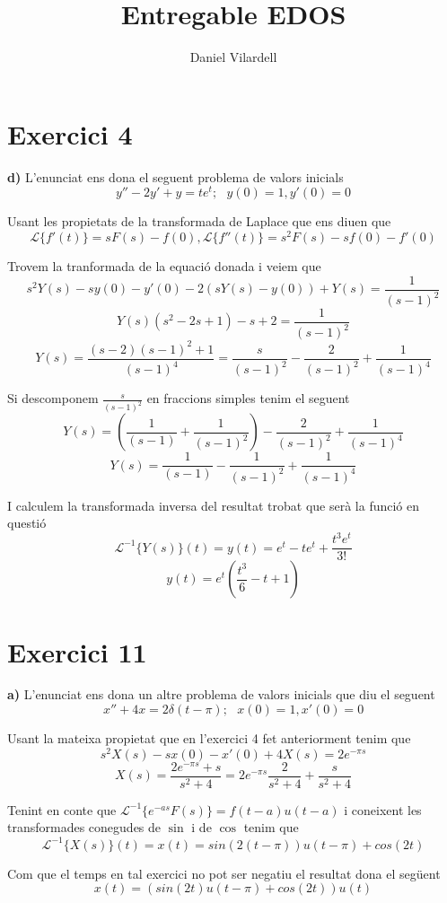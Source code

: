 \documentclass[12pt, a4papre]{article}
\author{Daniel Vilardell}
\title{Entregable EDOS}
\date{}
\begin{document}
	\maketitle
	\section{Exercici 4}
	\textbf{d)} L'enunciat ens dona el seguent problema de valors inicials
	\[
		y''-2y'+y=te^t; \textrm{  }y(0)=1,y'(0)=0
	\]
	
	Usant les propietats de la transformada de Laplace que ens diuen que 
	\[
		\mathcal{L}\{f'(t)\}=sF(s)-f(0), \mathcal{L}\{f''(t)\}=s^2F(s)-sf(0)-f'(0)
	\]
	
	Trovem la tranformada de la equació donada i veiem que
	\[
		s^2Y(s)-sy(0)-y'(0)-2(sY(s)-y(0))+Y(s)=\frac{1}{(s-1)^2}
	\]
	\[
		Y(s)(s^2-2s+1)-s+2=\frac{1}{(s-1)^2}
	\]
	\[
	Y(s)=\frac{(s-2)(s-1)^2+1}{(s-1)^4}=\frac{s}{(s-1)^2}-\frac{2}{(s-1)^2}+\frac{1}{(s-1)^4}
	\]
	
	Si descomponem $\frac{s}{(s-1)^2}$ en fraccions simples tenim el seguent
	\[
		Y(s)=\left(\frac{1}{(s-1)} + \frac{1}{(s-1)^2}\right)-\frac{2}{(s-1)^2}+\frac{1}{(s-1)^4}
	\]
	\[
		Y(s)=\frac{1}{(s-1)} - \frac{1}{(s-1)^2}+\frac{1}{(s-1)^4}
	\]
	
	I calculem la transformada inversa del resultat trobat que serà la funció en questió
	\[
		\mathcal{L}^{-1}\{Y(s)\}(t)=y(t)=e^t-te^t+\frac{t^3e^t}{3!}
	\]
	\[
		y(t)=e^t\left(\frac{t^3}{6}-t+1\right)
	\]
	
	
	
	
	\newpage
	\section{Exercici 11}
	\textbf{a)} L'enunciat ens dona un altre problema de valors inicials que diu el seguent
	\[
		x''+4x=2\delta(t-\pi); \textrm{  }x(0)=1, x'(0)=0
	\]
	
	Usant la mateixa propietat que en l'exercici 4 fet anteriorment tenim que
	\[
		s^2X(s)-sx(0)-x'(0)+4X(s)=2e^{-\pi s}
	\]
	\[
		X(s)=\frac{2e^{-\pi s}+s}{s^2+4}=2e^{-\pi s}\frac{2}{s^2+4}+\frac{s}{s^2+4}
	\]
	
	Tenint en conte que $\mathcal{L}^{-1}\{e^{-as}F(s)\}=f(t-a)u(t-a)$ i coneixent les transformades conegudes de $\sin$ i de $\cos$ tenim que
	\[
		\mathcal{L}^{-1}\{X(s)\}(t)=x(t)=sin(2(t-\pi))u(t-\pi)+cos(2t)
	\]
	
	Com que el temps en tal exercici no pot ser negatiu el resultat dona el següent
	\[
		x(t)=(sin(2t)u(t-\pi)+cos(2t))u(t)
	\]
	
\end{document}
